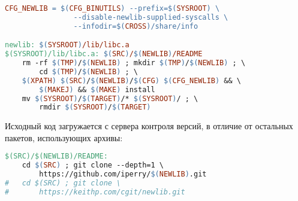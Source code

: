 \clearpage
\begin{lstlisting}[language=make]
CFG_NEWLIB = $(CFG_BINUTILS) --prefix=$(SYSROOT) \
				--disable-newlib-supplied-syscalls \
				--infodir=$(CROSS)/share/info

newlib: $(SYSROOT)/lib/libc.a
$(SYSROOT)/lib/libc.a: $(SRC)/$(NEWLIB)/README
	rm -rf $(TMP)/$(NEWLIB) ; mkdir $(TMP)/$(NEWLIB) ; \
		cd $(TMP)/$(NEWLIB) ; \
	$(XPATH) $(SRC)/$(NEWLIB)/$(CFG) $(CFG_NEWLIB) && \
		$(MAKEJ) && $(MAKE) install
	mv $(SYSROOT)/$(TARGET)/* $(SYSROOT)/ ; \
		rmdir $(SYSROOT)/$(TARGET)
\end{lstlisting}
\clearpage
Исходный код \file{newlib} загружается с сервера контроля версий, в отличие от
остальных пакетов, использующих архивы:
\begin{lstlisting}[language=make]
$(SRC)/$(NEWLIB)/README:
	cd $(SRC) ; git clone --depth=1 \
		https://github.com/iperry/$(NEWLIB).git
#	cd $(SRC) ; git clone \
#		https://keithp.com/cgit/newlib.git
\end{lstlisting}
